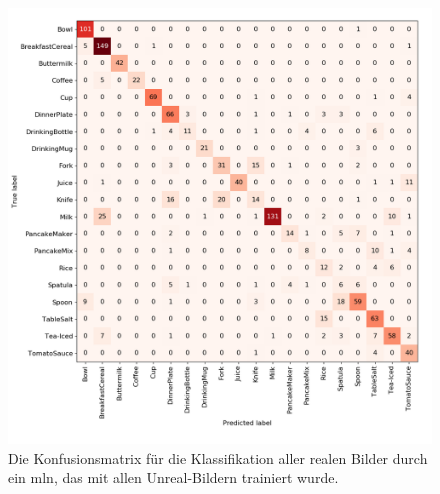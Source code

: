 \begin{figure}
	\includegraphics[scale=.4]{img/chapter6/UnrealRealGTClass.png}
\caption[Konfusionsmatrix der Klassifikation mit Unreal-Trainingsset und Real-Testset]{Die Konfusionsmatrix für die Klassifikation aller realen Bilder durch ein \gls{mln}, das mit allen Unreal-Bildern trainiert wurde.}
\label{fig:UnrealRealGTClass_confMatrix}
\end{figure}  

